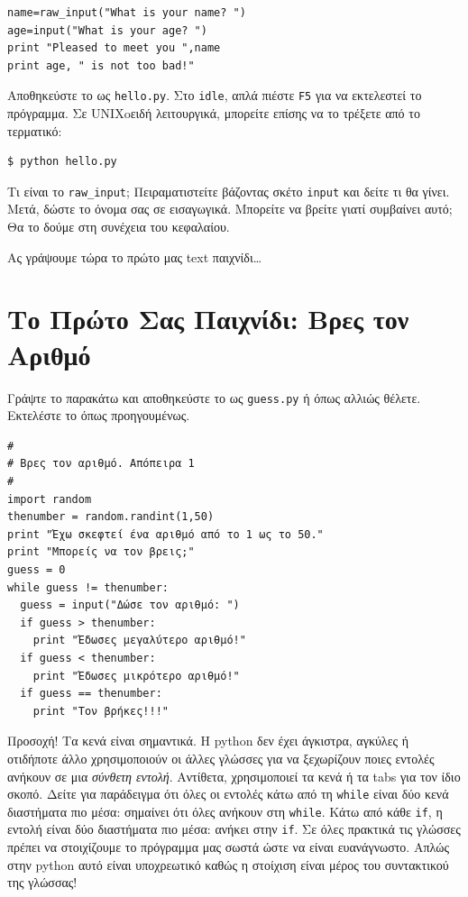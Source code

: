 \begin{verbatim}
name=raw_input("What is your name? ")
age=input("What is your age? ")
print "Pleased to meet you ",name
print age, " is not too bad!"
\end{verbatim}

Αποθηκεύστε το ως {\tt hello.py}. Στο {\tt idle}, απλά πιέστε {\tt F5} για να εκτελεστεί το πρόγραμμα.  Σε UNIXoειδή λειτουργικά, μπορείτε επίσης να το τρέξετε από το τερματικό:
%
\begin{verbatim}
$ python hello.py
\end{verbatim}
%
Τι είναι το {\tt raw\_input}; Πειραματιστείτε βάζοντας σκέτο {\tt input} και δείτε τι θα γίνει. Μετά, δώστε το όνομα σας σε εισαγωγικά. Μπορείτε να βρείτε γιατί
συμβαίνει αυτό; Θα το δούμε στη συνέχεια του κεφαλαίου.

Ας γράψουμε τώρα το πρώτο μας text παιχνίδι\ldots
%
\section{Το Πρώτο Σας Παιχνίδι: Βρες τον Αριθμό}
%
Γράψτε το παρακάτω και αποθηκεύστε το ως {\tt guess.py} ή όπως αλλιώς θέλετε.
Εκτελέστε το όπως προηγουμένως.

\begin{verbatim}
#
# Βρες τον αριθμό. Απόπειρα 1
#
import random
thenumber = random.randint(1,50)
print "Έχω σκεφτεί ένα αριθμό από το 1 ως το 50."
print "Μπορείς να τον βρεις;"
guess = 0
while guess != thenumber:
  guess = input("Δώσε τον αριθμό: ")
  if guess > thenumber:
    print "Έδωσες μεγαλύτερο αριθμό!"
  if guess < thenumber:
    print "Έδωσες μικρότερο αριθμό!"
  if guess == thenumber:
    print "Τον βρήκες!!!"
\end{verbatim}

Προσοχή! Τα κενά είναι σημαντικά. Η python δεν έχει άγκιστρα, αγκύλες ή
οτιδήποτε άλλο χρησιμοποιούν οι άλλες γλώσσες για να ξεχωρίζουν ποιες
εντολές ανήκουν σε μια {\em σύνθετη εντολή}. Αντίθετα, χρησιμοποιεί τα κενά
ή τα tabs για τον ίδιο σκοπό. Δείτε για παράδειγμα ότι όλες οι εντολές
κάτω από τη {\tt while} είναι δύο κενά διαστήματα πιο μέσα: σημαίνει ότι όλες
ανήκουν στη {\tt while}. Κάτω από κάθε {\tt if}, η εντολή είναι δύο διαστήματα πιο μέσα: ανήκει στην {\tt if}. Σε όλες πρακτικά τις γλώσσες πρέπει να στοιχίζουμε το πρόγραμμα μας σωστά ώστε να είναι ευανάγνωστο. Απλώς στην python αυτό είναι
υποχρεωτικό καθώς η στοίχιση είναι μέρος του συντακτικού της γλώσσας!
%
